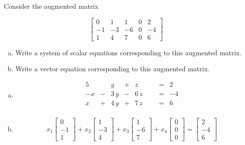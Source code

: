 
\begin{exerciseStatement}


 Consider the augmented matrix 

\[ \left[\begin{array}{cccc|c}
0 & 1 & 1 & 0 & 2 \\
-1 & -3 & -6 & 0 & -4 \\
1 & 4 & 7 & 0 & 6
\end{array}\right] \]
\begin{enumerate}[(a)]
\item  Write a system of scalar equations corresponding to this augmented matrix. 
\item  Write a vector equation corresponding to this augmented matrix. 
\end{enumerate}
    
\end{exerciseStatement}
    
\begin{exerciseAnswer} 

\begin{enumerate}[(a)]
\item 
\begin{alignat*}{5}  & & y &+& z & &  &=& 2 \\-x &-& 3 \, y &-& 6 \, z & &  &=& -4 \\x &+& 4 \, y &+& 7 \, z & &  &=& 6 \\ \end{alignat*}
            
\item \[ x_{1} \left[\begin{array}{c}
0 \\
-1 \\
1
\end{array}\right] + x_{2} \left[\begin{array}{c}
1 \\
-3 \\
4
\end{array}\right] + x_{3} \left[\begin{array}{c}
1 \\
-6 \\
7
\end{array}\right] + x_{4} \left[\begin{array}{c}
0 \\
0 \\
0
\end{array}\right] = \left[\begin{array}{c}
2 \\
-4 \\
6
\end{array}\right] \]
\end{enumerate}
    
\end{exerciseAnswer}
    
